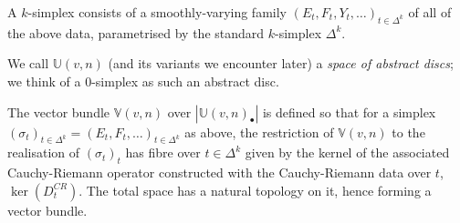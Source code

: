 \documentclass{TPmod}
\def\bU{\mathbb{U}}
\def\bV{\mathbb{V}}
\numberwithin{equation}{section}
\begin{document}
\begin{defn}
        A $k$-simplex consists of a smoothly-varying family $(E_t, F_t, Y_t, \ldots)_{t \in \Delta^k}$ of all of the above data, parametrised by the standard $k$-simplex $\Delta^k$.

        We call $\bU(v,n)$ (and its variants we encounter later) a \emph{space of abstract discs}; we think of a 0-simplex as such an abstract disc.

        The vector bundle $\bV(v,n)$ over $|\bU(v,n)_\bullet|$ is defined so that for a simplex $(\sigma_t)_{t \in \Delta^k} = (E_t, F_t, \ldots)_{t \in \Delta^k}$ as above, the restriction of $\bV(v,n)$ to the realisation of $(\sigma_t)_t$ has fibre over $t \in \Delta^k$ given by the kernel of the associated Cauchy-Riemann operator constructed with the Cauchy-Riemann data over $t$, $\ker(D^{CR}_t)$. The total space has a natural topology on it, hence forming a vector bundle.
    \end{defn}
    
\end{document}
